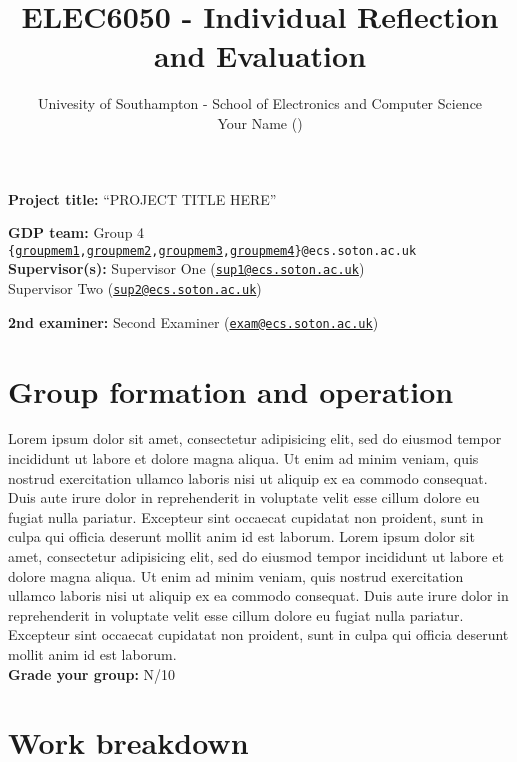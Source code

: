 \documentclass[10pt,a4paper]{article}
\title{ELEC6050 - Individual Reflection and Evaluation}
\author{Univesity of Southampton - School of Electronics and Computer Science \\
Your Name (\mailto{you@ecs.soton.ac.uk})}
\newcommand{\mailto}[1]{\href{mailto:#1}{\nolinkurl{#1}}}
\begin{document}
\maketitle

\newcommand{\mailtoecs}[1]{\href{mailto:#1@ecs.soton.ac.uk}{\nolinkurl{#1}}}

{\centering
  \textbf{Project title:}    ``PROJECT TITLE HERE''
  
  \textbf{GDP team:}	Group 4 \texttt{\{\mailtoecs{groupmem1},\mailtoecs{groupmem2},\mailtoecs{groupmem3},\mailtoecs{groupmem4}\}@ecs.soton.ac.uk}\\[0.3cm]

  \textbf{Supervisor(s):}		Supervisor One (\mailto{sup1@ecs.soton.ac.uk})\\
                            Supervisor Two (\mailto{sup2@ecs.soton.ac.uk})

  \textbf{2nd examiner:}		Second Examiner (\mailto{exam@ecs.soton.ac.uk})

}

\section*{Group formation and operation}
\begin{framed}
Lorem ipsum dolor sit amet, consectetur adipisicing elit, sed do eiusmod tempor incididunt ut labore et dolore magna aliqua. Ut enim ad minim veniam, quis nostrud exercitation ullamco laboris nisi ut aliquip ex ea commodo consequat. Duis aute irure dolor in reprehenderit in voluptate velit esse cillum dolore eu fugiat nulla pariatur. Excepteur sint occaecat cupidatat non proident, sunt in culpa qui officia deserunt mollit anim id est laborum.
Lorem ipsum dolor sit amet, consectetur adipisicing elit, sed do eiusmod tempor incididunt ut labore et dolore magna aliqua. Ut enim ad minim veniam, quis nostrud exercitation ullamco laboris nisi ut aliquip ex ea commodo consequat. Duis aute irure dolor in reprehenderit in voluptate velit esse cillum dolore eu fugiat nulla pariatur. Excepteur sint occaecat cupidatat non proident, sunt in culpa qui officia deserunt mollit anim id est laborum.\\

\textbf{Grade your group:} N/10
\end{framed}


\section*{Work breakdown}
\end{document}
